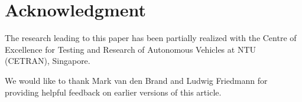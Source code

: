 \section*{Acknowledgment}

The research leading to this paper has been partially realized with the Centre of Excellence for Testing and Research of Autonomous Vehicles at NTU (CETRAN), Singapore. 

We would like to thank Mark van den Brand and Ludwig Friedmann for providing helpful feedback on earlier versions of this article.
